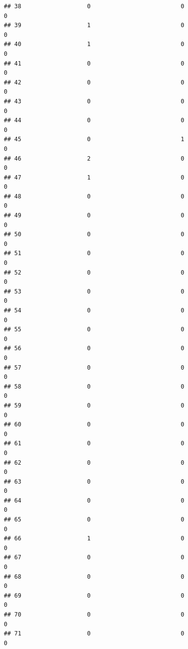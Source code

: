 \documentclass[
]{article}
\begin{document}
\begin{verbatim}
## 38                   0                          0                       0
## 39                   1                          0                       0
## 40                   1                          0                       0
## 41                   0                          0                       0
## 42                   0                          0                       0
## 43                   0                          0                       0
## 44                   0                          0                       0
## 45                   0                          1                       0
## 46                   2                          0                       0
## 47                   1                          0                       0
## 48                   0                          0                       0
## 49                   0                          0                       0
## 50                   0                          0                       0
## 51                   0                          0                       0
## 52                   0                          0                       0
## 53                   0                          0                       0
## 54                   0                          0                       0
## 55                   0                          0                       0
## 56                   0                          0                       0
## 57                   0                          0                       0
## 58                   0                          0                       0
## 59                   0                          0                       0
## 60                   0                          0                       0
## 61                   0                          0                       0
## 62                   0                          0                       0
## 63                   0                          0                       0
## 64                   0                          0                       0
## 65                   0                          0                       0
## 66                   1                          0                       0
## 67                   0                          0                       0
## 68                   0                          0                       0
## 69                   0                          0                       0
## 70                   0                          0                       0
## 71                   0                          0                       0

\end{verbatim}
\end{document}
